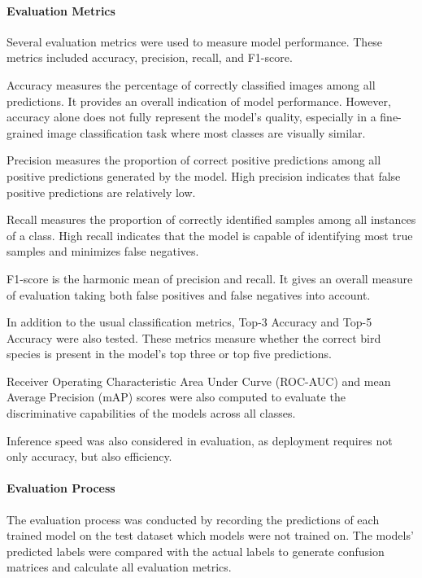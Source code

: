 \paragraph{Evaluation Metrics}

Several evaluation metrics were used to measure model performance. These metrics included accuracy, precision,
recall, and F1-score.

Accuracy measures the percentage of correctly classified images among all
predictions. It provides an overall indication of model performance.
However, accuracy alone does not fully represent the model's quality,
especially in a fine-grained image classification task where most classes are visually similar.

Precision measures the proportion of correct positive predictions among all
positive predictions generated by the model. High precision indicates that
false positive predictions are relatively low.

Recall measures the proportion of correctly identified samples among all
instances of a class. High recall indicates that the model is capable
of identifying most true samples and minimizes false negatives.

F1-score is the harmonic mean of precision and recall. It gives an overall 
measure of evaluation taking both false positives and false negatives into account.

In addition to the usual classification metrics, Top-3 Accuracy and Top-5 Accuracy were also tested. 
These metrics measure whether the correct bird species is present in the model’s top three or top five predictions.

Receiver Operating Characteristic Area Under Curve (ROC-AUC) and mean Average Precision (mAP) scores were also computed to evaluate the discriminative capabilities of the models across all classes.

Inference speed was also considered in evaluation, as deployment requires not only accuracy, but also efficiency.

\paragraph{Evaluation Process}

The evaluation process was conducted by recording the predictions of each trained 
model on the test dataset which models were not trained on. 
The models' predicted labels were compared with the actual labels to generate 
confusion matrices and calculate all evaluation metrics.

